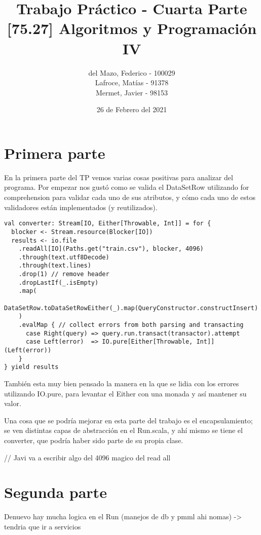 \documentclass[a4paper]{article}
\title{Trabajo Práctico - Cuarta Parte \\ \large{[75.27] Algoritmos y Programación IV}}
\author{del Mazo, Federico - 100029 \\ Lafroce, Matías - 91378 \\ Mermet, Javier - 98153 }
\date{26 de Febrero del 2021}
\begin{document}
\maketitle


\section{Primera parte}

En la primera parte del TP vemos varias cosas positivas para analizar del programa. Por empezar nos gustó como se valida el DataSetRow utilizando for comprehension para validar cada uno de sus atributos, y cómo cada uno de estos validadores están implementados (y reutilizados).

\begin{lstlisting}[style=scala]
val converter: Stream[IO, Either[Throwable, Int]] = for {
  blocker <- Stream.resource(Blocker[IO])
  results <- io.file
    .readAll[IO](Paths.get("train.csv"), blocker, 4096)
    .through(text.utf8Decode)
    .through(text.lines)
    .drop(1) // remove header
    .dropLastIf(_.isEmpty)
    .map(
      DataSetRow.toDataSetRowEither(_).map(QueryConstructor.constructInsert)
    )
    .evalMap { // collect errors from both parsing and transacting
      case Right(query) => query.run.transact(transactor).attempt
      case Left(error)  => IO.pure[Either[Throwable, Int]](Left(error))
    }
} yield results
\end{lstlisting}

También esta muy bien pensado la manera en la que se lidia con los errores utilizando IO.pure, para levantar el Either con una monada y así mantener su valor.

Una cosa que se podría mejorar en esta parte del trabajo es el encapsulamiento; se ven distintas capas de abstracción en el Run.scala, y ahí mismo se tiene el converter, que podría haber sido parte de su propia clase.

// Javi va a escribir algo del 4096 magico del read all

\section{Segunda parte}

Denuevo hay mucha logica en el Run (manejos de db y pmml ahi nomas) -> tendria que ir a servicios
\end{document}
